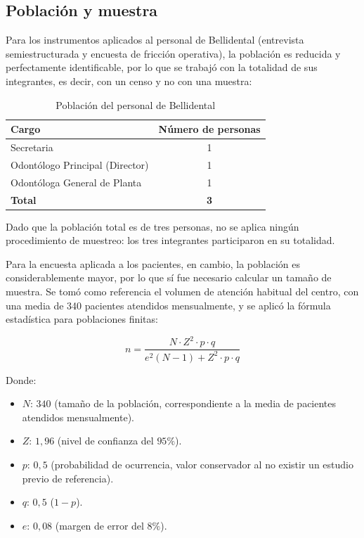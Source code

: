 \subsection{Población y muestra}
Para los instrumentos aplicados al personal de Bellidental (entrevista semiestructurada y encuesta de fricción operativa), la población es reducida y perfectamente identificable, por lo que se trabajó con la totalidad de sus integrantes, es decir, con un censo y no con una muestra:

\begin{table}[H]
\centering
\caption{Población del personal de Bellidental}
\label{tab:poblacion_personal}
\fontsize{10}{12}\selectfont
\renewcommand{\arraystretch}{1.2}
\begin{tabular}{|l|c|}
\hline
\textbf{Cargo} & \textbf{Número de personas} \\
\hline
Secretaria & 1 \\
Odontólogo Principal (Director) & 1 \\
Odontóloga General de Planta & 1 \\
\hline
\textbf{Total} & \textbf{3} \\
\hline
\end{tabular}
\end{table}

Dado que la población total es de tres personas, no se aplica ningún procedimiento de muestreo: los tres integrantes participaron en su totalidad.

Para la encuesta aplicada a los pacientes, en cambio, la población es considerablemente mayor, por lo que sí fue necesario calcular un tamaño de muestra. Se tomó como referencia el volumen de atención habitual del centro, con una media de 340 pacientes atendidos mensualmente, y se aplicó la fórmula estadística para poblaciones finitas:

\begin{equation}
n = \frac{N \cdot Z^{2} \cdot p \cdot q}{e^{2}(N - 1) + Z^{2} \cdot p \cdot q}
\end{equation}

Donde:
\begin{itemize}
    \item $N$: $340$ (tamaño de la población, correspondiente a la media de pacientes atendidos mensualmente).
    \item $Z$: $1{,}96$ (nivel de confianza del $95\%$).
    \item $p$: $0{,}5$ (probabilidad de ocurrencia, valor conservador al no existir un estudio previo de referencia).
    \item $q$: $0{,}5$ ($1 - p$).
    \item $e$: $0{,}08$ (margen de error del $8\%$).
\end{itemize}

